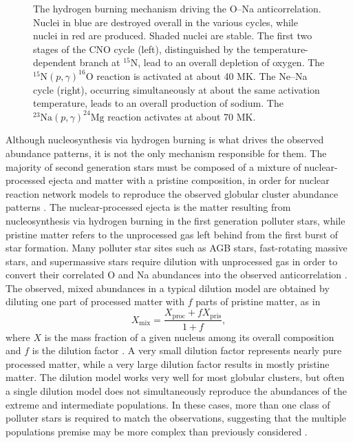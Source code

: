 \begin{figure}[t]
\begin{minipage}{.44\linewidth}
\begin{tikzpicture}[scale=1.5, every node/.style={transform shape}]
\end{tikzpicture}
\end{minipage}
\vspace{0.75 cm}
\caption{\label{fig:CNO_NeNa}The hydrogen burning mechanism driving the O--Na anticorrelation. Nuclei in blue are destroyed overall in the various cycles, while nuclei in red are produced. Shaded nuclei are stable. The first two stages of the CNO cycle (left), distinguished by the temperature-dependent branch at $^{15}$N, lead to an overall depletion of oxygen. The $^{15}\mathrm{N}(p, \gamma)^{16}\mathrm{O}$ reaction is activated at about 40 MK. The Ne--Na cycle (right), occurring simultaneously at about the same activation temperature, leads to an overall production of sodium. The $^{23}\mathrm{Na}(p,\gamma)^{24}\mathrm{Mg}$ reaction activates at about 70 MK.}
\end{figure}


Although nucleosynthesis via hydrogen burning is what drives the observed abundance patterns, it is not the only mechanism responsible for them. The majority of second generation stars must be composed of a mixture of nuclear-processed ejecta and matter with a pristine composition, in order for nuclear reaction network models to reproduce the observed globular cluster abundance patterns \cite{Prantzos2007}. The nuclear-processed ejecta is the matter resulting from nucleosynthesis via hydrogen burning in the first generation polluter stars, while pristine matter refers to the unprocessed gas left behind from the first burst of star formation. Many polluter star sites such as AGB stars, fast-rotating massive stars, and supermassive stars require dilution with unprocessed gas in order to convert their correlated O and Na abundances into the observed anticorrelation \cite{DErcole2010,DErcole2011,DErcole2012}. The observed, mixed abundances in a typical dilution model are obtained by diluting one part of processed matter with $f$ parts of pristine matter, as in
\begin{equation} \label{eqn:mixing}
X_{\mathrm{mix}} = \frac{X_{\mathrm{proc}} + f X_{\mathrm{pris}}}{1 + f},
\end{equation}
where $X$ is the mass fraction of a given nucleus among its overall composition and $f$ is the dilution factor \cite{Prantzos2007,Carretta2009}. A very small dilution factor represents nearly pure processed matter, while a very large dilution factor results in mostly pristine matter. The dilution model works very well for most globular clusters, but often a single dilution model does not simultaneously reproduce the abundances of the extreme and intermediate populations. In these cases, more than one class of polluter stars is required to match the observations, suggesting that the multiple populations premise may be more complex than previously considered \cite{Gratton2019}.

